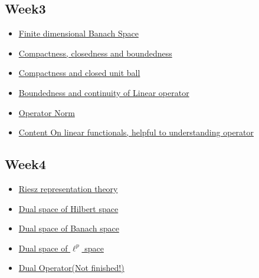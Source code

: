 \subsection{Week3}
\begin{itemize}
	\item \hyperref[finite dimensional Banach]{Finite dimensional Banach Space}

	\item \hyperref[compactness]{Compactness, closedness and boundedness}
	\item \hyperref[compact unit balls]{Compactness and closed unit ball}
	\item \hyperref[continuity of LO]{Boundedness and continuity of Linear operator}
	\item \hyperref[operator norm]{Operator Norm}
	\item \hyperref[Linear Functionals]{\color{red}Content On linear functionals, helpful to understanding operator}
\end{itemize}

\subsection{Week4}
\begin{itemize}
	\item \hyperref[Riesz representation theory]{Riesz representation theory}
	\item \hyperref[dual space Hilbert]{Dual space of Hilbert space}
	\item \hyperref[dual space Banach]{Dual space of Banach space}
	\item \hyperref[lp dual]{Dual space of $\ell^p$ space}
	\item \hyperref[dual operator]{Dual Operator(Not finished!)}
\end{itemize}






